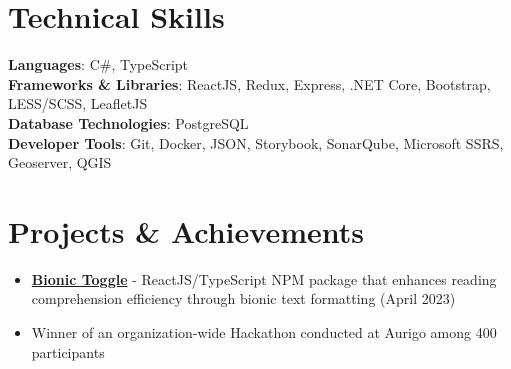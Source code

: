 \documentclass[a4paper,12pt]{article}
\newcommand{\resumeItem}[1]{
  \item\small{
    {#1 \vspace{-2pt}}
  }
}
\newcommand{\resumeSubHeadingListEnd}{\end{itemize}}
\newcommand{\resumeItemListStart}{\begin{itemize}}
\begin{document}
\vspace{-4pt}
\section{Technical Skills}
 \begin{itemize}[leftmargin=0.15in, label={}]
    \small{\item{
     \textbf{Languages}{: C\#, TypeScript} \\
     \textbf{Frameworks \& Libraries}{: ReactJS, Redux, Express, .NET Core, Bootstrap, LESS/SCSS, LeafletJS} \\
     \textbf{Database Technologies}{: PostgreSQL} \\
     \textbf{Developer Tools}{: Git, Docker, JSON, Storybook, SonarQube, Microsoft SSRS, Geoserver, QGIS}
    }}
 \end{itemize}

\vspace{-6pt}
\section{Projects \& Achievements}
    \resumeItemListStart
          \resumeItem{\textbf{\href{https://www.npmjs.com/package/bionictoggle}{Bionic Toggle}} - ReactJS/TypeScript NPM package that enhances reading comprehension efficiency through bionic text formatting (April 2023)}

          \resumeItem{Winner of an organization-wide Hackathon conducted at Aurigo among 400 participants}
    \resumeSubHeadingListEnd
\end{document}

